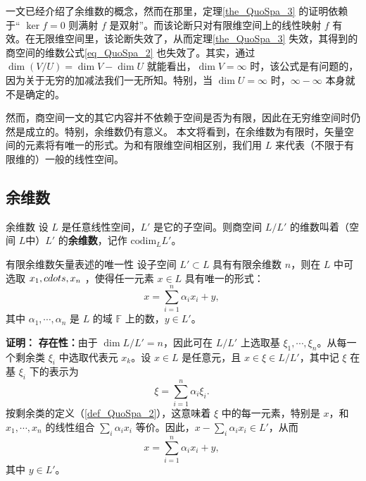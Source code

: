 

一文已经介绍了余维数的概念，然而在那里，定理\autoref{the_QuoSpa_3} 的证明依赖于“ $\ker f=0$ 则满射 $f$ 是双射”。而该论断只对有限维空间上的线性映射 $f$ 有效。在无限维空间里，该论断失效了，从而定理\autoref{the_QuoSpa_3} 失效，其得到的商空间的维数公式\autoref{eq_QuoSpa_2} 也失效了。其实，通过 $\dim(V/U) = \dim V - \dim U$ 就能看出，$\dim V=\infty$ 时，该公式是有问题的，因为关于无穷的加减法我们一无所知。特别，当 $\dim U=\infty$ 时，$\infty-\infty$ 本身就不是确定的。

然而，商空间一文的其它内容并不依赖于空间是否为有限，因此在无穷维空间时仍然是成立的。特别，余维数仍有意义。 本文将看到，在余维数为有限时，矢量空间的元素将有唯一的形式。为和有限维空间相区别，我们用 $L$ 来代表（不限于有限维的）一般的线性空间。

\subsection{余维数}

\begin{definition}{余维数}
设 $L$ 是任意线性空间，$L'$ 是它的子空间。则商空间 $L/L'$ 的维数叫着（空间 $L$中）$L'$ 的\textbf{余维数}，记作 $\mathrm{codim}_L L'$。 
\end{definition}


\begin{theorem}{有限余维数矢量表述的唯一性}
设子空间 $L'\subset L$ 具有有限余维数 $n$，则在 $L$ 中可选取 $x_1,\\cdots,x_n$ ，使得任一元素 $x\in L$ 具有唯一的形式：
\begin{equation}
x=\sum_{i=1}^n\alpha_i x_i+y,~
\end{equation}
其中 $\alpha_1,\cdots,\alpha_n$ 是 $L$ 的域 $\mathbb F$ 上的数，$y\in L'$。
\end{theorem}

\textbf{证明：}
\textbf{存在性：}由于 $\dim L/L'=n$，因此可在 $L/L'$ 上选取基 $\xi_1,\cdots,\xi_n$。从每一个剩余类 $\xi_i$ 中选取代表元 $x_k$。设 $x\in L$ 是任意元，且 $x\in\xi\in L/L'$，其中记 $\xi$ 在基 $\xi_i$ 下的表示为
\begin{equation}
\xi=\sum_{i=1}^n\alpha_i\xi_i.~
\end{equation}
按剩余类的定义（\autoref{def_QuoSpa_2}），这意味着 $\xi$ 中的每一元素，特别是 $x$，和 $x_1,\cdots,x_n$ 的线性组合 $\sum_i\alpha_i x_i$ 等价。因此，$x-\sum_i\alpha_i x_i\in L'$，从而
\begin{equation}
x=\sum_{i=1}^n\alpha_i x_i+y,~
\end{equation}
其中 $y\in L'$。

